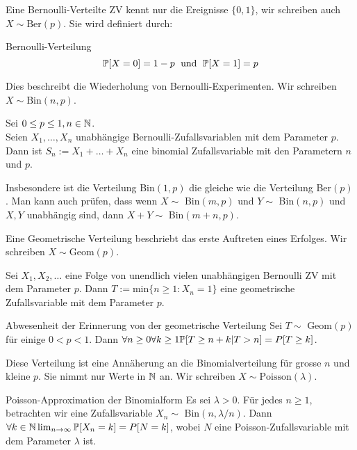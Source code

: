 Eine Bernoulli-Verteilte ZV kennt nur die Ereignisse $\{0,1\}$, wir schreiben auch $X \sim \text{Ber}(p)$. Sie wird definiert durch: 
\begin{mainbox}{Bernoulli-Verteilung}
    $$\mathbb{P}[X = 0] = 1 - p \; \text{ und } \; \mathbb{P}[X = 1] = p$$
\end{mainbox}

 Dies beschreibt die Wiederholung von Bernoulli-Experimenten. Wir schreiben $X \sim \text{Bin}(n,p)$.

 \begin{subbox}{}
    Sei $0 \leq p \leq 1, n \in \mathbb{N}$. \\
    Seien $X_1, \ldots , X_n$ unabhängige Bernoulli-Zufallsvariablen mit dem Parameter $p$. \\ Dann
    ist $S_n := X_1 + \ldots + X_n$
    eine binomial Zufallsvariable mit den Parametern $n$ und $p$.
\end{subbox}

Insbesondere ist die Verteilung Bin$(1, p)$ die gleiche wie die Verteilung Ber$(p)$. Man kann auch prüfen, dass wenn $X \sim$ Bin$(m, p)$ und $Y \sim$ Bin$(n, p)$ und $X, Y$ unabhängig sind, dann $X + Y \sim$ Bin$(m + n, p)$.

 Eine Geometrische Verteilung beschriebt das erste Auftreten eines Erfolges. Wir schreiben $X \sim \text{Geom}(p)$.

\begin{subbox}{}
    Sei $X_1, X_2, \ldots$ eine Folge von unendlich vielen unabhängigen Bernoulli ZV mit dem Parameter $p$. Dann
    $T := \text{min}\{n \geq 1 : X_n = 1\}$
    eine geometrische Zufallsvariable mit dem Parameter $p$.
\end{subbox}

\begin{subbox}{Abwesenheit der Erinnerung von der geometrische Verteilung}
    Sei $T \sim$ Geom$(p)$ für einige $0 < p < 1$. Dann
    $\forall n \geq 0 \forall k \geq 1 \mathbb{P}[T \geq n + k | T > n] = P[T \geq k]$.
\end{subbox}

 Diese Verteilung ist eine Annäherung an die Binomialverteilung für grosse $n$ und kleine $p$. Sie nimmt nur Werte in $\mathbb{N}$ an. Wir schreiben $X \sim \text{Poisson}(\lambda)$.

\begin{subbox}{Poisson-Approximation der Binomialform}
    Es sei $\lambda > 0$. Für jedes $n \geq 1$,
    betrachten wir eine Zufallsvariable $X_n \sim$ Bin$(n, \lambda / n)$. Dann
    $\forall k \in \mathbb{N} \lim_{n \rightarrow \infty} \mathbb{P}[X_n = k] = P[N = k]$,
    wobei $N$ eine Poisson-Zufallsvariable mit dem Parameter $\lambda$ ist.
\end{subbox}


